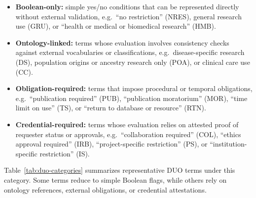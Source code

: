 \begin{itemize}
	\item \textbf{Boolean-only:} simple yes/no conditions that can be represented directly without external validation, e.g.\ ``no restriction'' (NRES), general research use (GRU), or ``health or medical or biomedical research'' (HMB).

	\item \textbf{Ontology-linked:} terms whose evaluation involves consistency checks against external vocabularies or classifications, e.g.\ disease-specific research (DS), population origins or ancestry research only (POA), or clinical care use (CC).

	\item \textbf{Obligation-required:} terms that impose procedural or temporal obligations, e.g.\ ``publication required'' (PUB), ``publication moratorium'' (MOR), ``time limit on use'' (TS), or ``return to database or resource'' (RTN).

	\item \textbf{Credential-required:} terms whose evaluation relies on attested proof of requester status or approvals, e.g.\ ``collaboration required'' (COL), ``ethics approval required'' (IRB), ``project-specific restriction'' (PS), or ``institution-specific restriction'' (IS).
\end{itemize}

\noindent
Table~\ref{tab:duo-categories} summarizes representative DUO terms under this category. Some terms reduce to simple Boolean flags, while others rely on ontology references, external obligations, or credential attestations.

